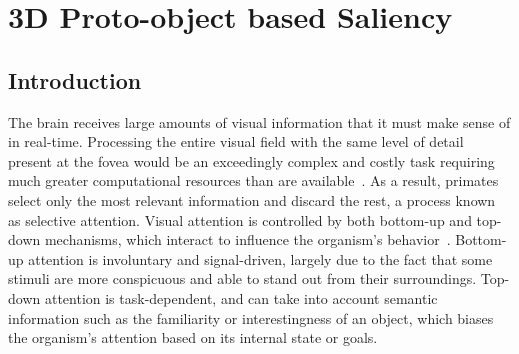 \chapter{3D Proto-object based Saliency}
\label{sec:saliency}

\section{Introduction}
The brain receives large amounts of visual information that it must make sense of in real-time. Processing the entire visual field with the same level of detail present at the fovea would be an exceedingly complex and costly task requiring much greater computational resources than are available~\citep{Tsotsos90}. As a result, primates select only the most relevant information and discard the rest, a process known as selective attention. Visual attention is controlled by both bottom-up and top-down mechanisms, which interact to influence the organism's behavior~\citep{Yarbus67}. Bottom-up attention is involuntary and signal-driven, largely due to the fact that some stimuli are more conspicuous and able to stand out from their surroundings. Top-down attention is task-dependent, and can take into account semantic information such as the familiarity or interestingness of an object, which biases the organism's attention based on its internal state or goals.

